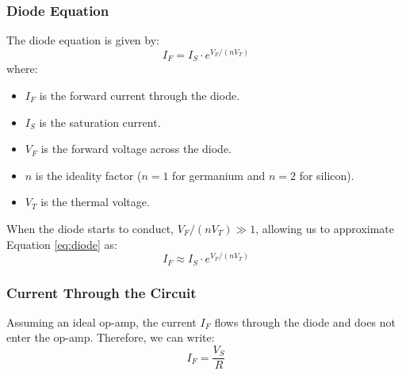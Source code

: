 \documentclass[a4paper,9pt,twoside,openany,twocolumn]{memoir}
\begin{document}
\subsubsection{Diode Equation}
The diode equation is given by:
\begin{equation}
I_F = I_S \cdot e^{V_F/(nV_T)}
\label{eq:diode}
\end{equation}
where:
\begin{itemize}
    \item \(I_F\) is the forward current through the diode.
    \item \(I_S\) is the saturation current.
    \item \(V_F\) is the forward voltage across the diode.
    \item \(n\) is the ideality factor (\(n=1\) for germanium and \(n=2\) for silicon).
    \item \(V_T\) is the thermal voltage.
\end{itemize}
When the diode starts to conduct, \(V_F/(nV_T) \gg 1\), allowing us to approximate Equation \ref{eq:diode} as:
\begin{equation}
I_F \approx I_S \cdot e^{V_F/(nV_T)}
\label{eq:diode_approx}
\end{equation}

\subsubsection{Current Through the Circuit}
Assuming an ideal op-amp, the current \(I_F\) flows through the diode and does not enter the op-amp. Therefore, we can write:
\begin{equation}
I_F = \frac{V_S}{R}
\label{eq:current}
\end{equation}
\end{document}
